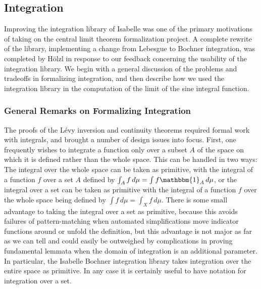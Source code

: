 \documentclass[leqno]{article}
\theoremstyle{definition}
\begin{document}
\subsection{Integration}

Improving the integration library of Isabelle was one of the primary motivations of taking on the central limit theorem formalization project. A complete rewrite of the library, implementing a change from Lebesgue to Bochner integration, was completed by H\"olzl in response to our feedback concerning the usability of the integration library. We begin with a general discussion of the problems and tradeoffs in formalizing integration, and then describe how we used the integration library in the computation of the limit of the sine integral function.

\subsubsection{General Remarks on Formalizing Integration} \label{sec:form_int}

The proofs of the L\'evy inversion and continuity theorems required formal work with integrals, and brought a number of design issues into focus. First, one frequently wishes to integrate a function only over a subset $A$ of the space on which it is defined rather than the whole space. This can be handled in two ways: The integral over the whole space can be taken as primitive, with the integral of a function $f$ over a set $A$ defined by $\int_A f \, d\mu = \int f \mathbbm{1}_A \, d\mu$, or the integral over a set can be taken as primitive with the integral of a function $f$ over the whole space being defined by $\int f \, d\mu = \int_X f \, d\mu$. There is some small advantage to taking the integral over a set as primitive, because this avoids failures of pattern-matching when automated simplifications move indicator functions around or unfold the definition, but this advantage is not major as far as we can tell and could easily be outweighed by complications in proving fundamental lemmata when the domain of integration is an additional parameter. In particular, the Isabelle Bochner integration library takes integration over the entire space as primitive. In any case it is certainly useful to have notation for integration over a set.
\end{document}
